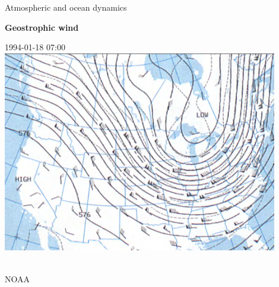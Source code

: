 \documentclass[aspectratio=169,xcolor=dvipsnames]{beamer}
\newcommand\credit[2]{
        \\ \vspace{-0.5em}
        {\color{gray}\scriptsize
        \hfill
        #1
        \hspace{#2}}
        }
\begin{document}
\begin{frame}[t]{Atmospheric and ocean dynamics}

\vspace{-1.0em}

\begin{center}
\textbf{{\large
Geostrophic wind
}}
\end{center}

\small 
\center

\begin{minipage}{0.6\textwidth}
\begin{center}

{\color{darkgray}\scriptsize
1994-01-18 07:00
} \\[0.2em]
\includegraphics[width=0.9\textwidth]{figs/Fig-geostrophic-wind-NOAA-1994-01-18-07-00-500_Mb_Height_Contours.png}
\credit{NOAA}{5pt}

\end{center}
\end{minipage}

\end{frame}
\end{document}
